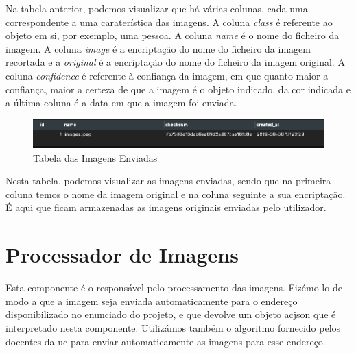 \documentclass{report}
\begin{document}
Na tabela anterior, podemos visualizar que há várias colunas, cada uma correspondente a uma caraterística das imagens. A coluna \textit{class} é referente ao objeto em si, por exemplo, uma pessoa. A coluna \textit{name} é o nome do ficheiro da imagem. A coluna \textit{image} é a encriptação do nome do ficheiro da imagem recortada e a \textit{original} é a encriptação do nome do ficheiro da imagem original. A coluna \textit{confidence} é referente à confiança da imagem, em que quanto maior a confiança, maior a certeza de que a imagem é o objeto indicado, da cor indicada e a última coluna é a data em que a imagem foi enviada.
\vspace{15mm}
\begin{figure}[!ht]
    \centering
    \includegraphics[scale = 0.8]{dbImagens.png}
    \caption{Tabela das Imagens Enviadas}
    \label{fig:bdimages}
\end{figure}

Nesta tabela, podemos visualizar as imagens enviadas, sendo que na primeira coluna temos o nome da imagem original e na coluna seguinte a sua encriptação. É aqui que ficam armazenadas as imagens originais enviadas pelo utilizador.

\chapter{Processador de Imagens}
\label{chap.processador}
Esta componente é o responsável pelo processamento das imagens. Fizémo-lo de modo a que a imagem seja enviada automaticamente para o endereço disponibilizado no enunciado do projeto, e que devolve um objeto ac{json} que é interpretado nesta componente. Utilizámos também o algoritmo fornecido pelos docentes da \ac{uc} para enviar automaticamente as imagens para esse endereço.
\end{document}
